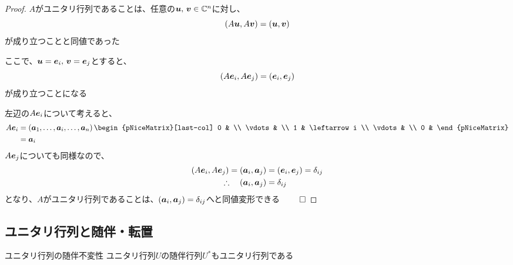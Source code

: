 \documentclass[../../../topic_linear-algebra]{subfiles}
\begin{document}
\begin{proof}
  $A$がユニタリ行列であることは、任意の$\vb*{u},\,\vb*{v} \in \mathbb{C}^n$に対し、
  \begin{equation*}
    (A\vb*{u}, A\vb*{v}) = (\vb*{u}, \vb*{v})
  \end{equation*}
  が成り立つことと同値であった

  ここで、$\vb*{u} = \vb*{e}_i,\, \vb*{v} = \vb*{e}_j$とすると、
  \begin{equation*}
    (A\vb*{e}_i, A\vb*{e}_j) = (\vb*{e}_i, \vb*{e}_j)
  \end{equation*}
  が成り立つことになる

  \br

  左辺の$A\vb*{e}_i$について考えると、
  \begin{align*}
    A\vb*{e}_i & = \left( \vb*{a}_1, \ldots, \vb*{a}_i, \ldots, \vb*{a}_n \right)
    \begin{pNiceMatrix}[last-col]
      0      &              \\
      \vdots &              \\
      1      & \leftarrow i \\
      \vdots &              \\
      0      &
    \end{pNiceMatrix}                                                  \\
               & = \vb*{a}_i
  \end{align*}
  $A\vb*{e}_j$についても同様なので、
  \begin{align*}
    (A\vb*{e}_i, A\vb*{e}_j) = (\vb*{a}_i, \vb*{a}_j) & = (\vb*{e}_i, \vb*{e}_j) = \delta_{ij} \\
    \therefore \quad (\vb*{a}_i, \vb*{a}_j)           & = \delta_{ij}
  \end{align*}
  となり、$A$がユニタリ行列であることは、$(\vb*{a}_i, \vb*{a}_j) = \delta_{ij}$へと同値変形できる $\qed$
\end{proof}

\subsection{ユニタリ行列と随伴・転置}

\begin{theorem}{ユニタリ行列の随伴不変性}
  ユニタリ行列$U$の随伴行列$U^*$もユニタリ行列である
\end{theorem}
\end{document}
